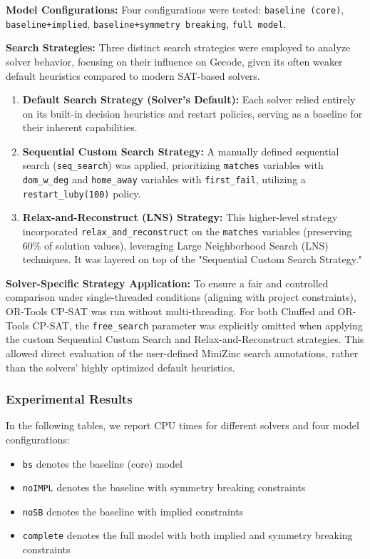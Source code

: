 \textbf{Model Configurations:}
Four configurations were tested: \texttt{baseline (core)}, \texttt{baseline+implied}, \texttt{baseline+symmetry breaking}, \texttt{full model}.

\textbf{Search Strategies:}
Three distinct search strategies were employed to analyze solver behavior, focusing on their influence on Gecode, given its often weaker default heuristics compared to modern SAT-based solvers.

\begin{enumerate}
    \item \textbf{Default Search Strategy (Solver's Default):} Each solver relied entirely on its built-in decision heuristics and restart policies, serving as a baseline for their inherent capabilities.

    \item \textbf{Sequential Custom Search Strategy:} A manually defined sequential search (\texttt{seq\_search}) was applied, prioritizing \texttt{matches} variables with \texttt{dom\_w\_deg} and \texttt{home\_away} variables with \texttt{first\_fail}, utilizing a \texttt{restart\_luby(100)} policy.

    \item \textbf{Relax-and-Reconstruct (LNS) Strategy:} This higher-level strategy incorporated \texttt{relax\_and\_reconstruct} on the \texttt{matches} variables (preserving 60\% of solution values), leveraging Large Neighborhood Search (LNS) techniques. It was layered on top of the "Sequential Custom Search Strategy."
\end{enumerate}

\textbf{Solver-Specific Strategy Application:}
To ensure a fair and controlled comparison under single-threaded conditions (aligning with project constraints), OR-Tools CP-SAT was run without multi-threading. For both Chuffed and OR-Tools CP-SAT, the \texttt{free\_search} parameter was explicitly omitted when applying the custom Sequential Custom Search and Relax-and-Reconstruct strategies. This allowed direct evaluation of the user-defined MiniZinc search annotations, rather than the solvers' highly optimized default heuristics.


\subsubsection{Experimental Results}
In the following tables, we report CPU times for different solvers and four model configurations:
\begin{itemize}
    \item \texttt{bs} denotes the baseline (core) model
     \item  \texttt{noIMPL} denotes the baseline with symmetry breaking constraints
    \item \texttt{noSB} denotes the baseline with implied constraints
    \item \texttt{complete} denotes the full model with both implied and symmetry breaking constraints
\end{itemize}

